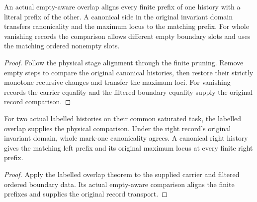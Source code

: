\begin{theorem}
\label{hir:g8-original-overlap-prefix-transport}
\leanok
An actual empty-aware overlap aligns every finite prefix of
one history with a literal prefix of the other. A canonical
side in the original invariant domain transfers canonicality
and the maximum locus to the matching prefix. For whole
vanishing records the comparison allows different empty
boundary slots and uses the matching ordered nonempty slots.
\end{theorem}
\begin{proof}
Follow the physical stage alignment through the finite
pruning. Remove empty steps to compare the original
canonical histories, then restore their strictly monotone
recursive changes and transfer the maximum loci. For
vanishing records the carrier equality and the filtered
boundary equality supply the original record comparison.
\end{proof}

\begin{theorem}
\label{hir:g8-labelled-native-original-overlap}
\leanok
For two actual labelled histories on their common saturated
task, the labelled overlap supplies the physical comparison.
Under the right record's original invariant domain, whole
mark-one canonicality agrees. A canonical right history
gives the matching left prefix and its original maximum
locus at every finite right prefix.
\end{theorem}
\begin{proof}
Apply the labelled overlap theorem to the supplied carrier
and filtered ordered boundary data. Its actual empty-aware
comparison aligns the finite prefixes and supplies the
original record transport.
\end{proof}

